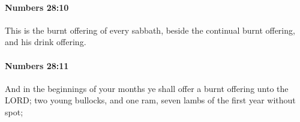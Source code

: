 		\paragraph{Numbers 28:10} %
			\label{NUMBERS-28-10}

			This is the burnt offering of every sabbath, beside the continual burnt offering, and his drink offering.


		\paragraph{Numbers 28:11} %
			\label{NUMBERS-28-11}

			And in the beginnings of your months ye shall offer a burnt offering unto the LORD; two young bullocks, and one ram, seven lambs of the first year without spot;


